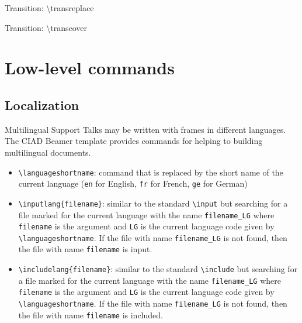 \documentclass[english,sectioncirclenumberstyle]{ciadbeamer}
\begin{document}
\begin{frame}[c]{Transition: {\textbackslash}transreplace}
	\transreplace
	\begin{center}
	\end{center}
\end{frame}

\begin{frame}[c]{Transition: {\textbackslash}transcover}
	\transcover
	\begin{center}
	\end{center}
\end{frame}



\section{Low-level commands}
\sectiontableofcontentslide

\subsection{Localization}

\begin{frame}{Multilingual Support}
	Talks may be written with frames in different languages. The CIAD Beamer template provides commands for helping to building multilingual documents.
	\begin{itemize}
	\item \texttt{{\textbackslash}languageshortname}: command that is replaced by the short name of the current language (\texttt{en} for English, \texttt{fr} for French, \texttt{ge} for German)
	\item \texttt{{\textbackslash}inputlang\{filename\}}: similar to the standard \texttt{{\textbackslash}input} but searching for a file marked for the current language with the name \texttt{filename\_LG} where \texttt{filename} is the argument and \texttt{LG} is the current language code given by \texttt{{\textbackslash}languageshortname}. If the file with name \texttt{filename\_LG} is not found, then the file with name \texttt{filename} is input.
	\item \texttt{{\textbackslash}includelang\{filename\}}: similar to the standard \texttt{{\textbackslash}include} but searching for a file marked for the current language with the name \texttt{filename\_LG} where \texttt{filename} is the argument and \texttt{LG} is the current language code given by \texttt{{\textbackslash}languageshortname}. If the file with name \texttt{filename\_LG} is not found, then the file with name \texttt{filename} is included.
	\end{itemize}
\end{frame}
\end{document}

